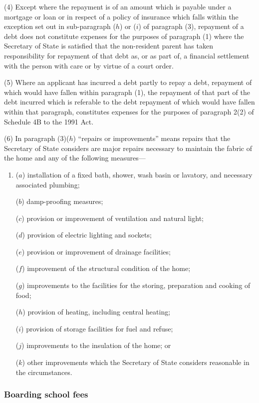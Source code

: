 \documentclass[12pt,a4paper]{article}
\begin{document}
(4) Except where the repayment is of an amount which is payable under a mortgage or loan or in respect of a policy of insurance which falls within the exception set out in sub-paragraph ($h$)  or ($i$)  of paragraph (3), repayment of a debt does not constitute expenses for the purposes of paragraph (1) where the Secretary of State is satisfied that the non-resident parent has taken responsibility for repayment of that debt as, or as part of, a financial settlement with the person with care or by virtue of a court order.

(5) Where an applicant has incurred a debt partly to repay a debt, repayment of which would have fallen within paragraph (1), the repayment of that part of the debt incurred which is referable to the debt repayment of which would have fallen within that paragraph, constitutes expenses for the purposes of paragraph 2(2) of Schedule 4B to the 1991 Act.

(6) In paragraph (3)($h$)  “repairs or improvements” means repairs that the Secretary of State considers are major repairs necessary to maintain the fabric of the home and any of the following measures—
\begin{enumerate}\item[]
($a$) installation of a fixed bath, shower, wash basin or lavatory, and necessary associated plumbing;

($b$) damp-proofing measures;

($c$) provision or improvement of ventilation and natural light;

($d$) provision of electric lighting and sockets;

($e$) provision or improvement of drainage facilities;

($f$) improvement of the structural condition of the home;

($g$) improvements to the facilities for the storing, preparation and cooking of food;

($h$) provision of heating, including central heating;

($i$) provision of storage facilities for fuel and refuse;

($j$) improvements to the insulation of the home; or

($k$) other improvements which the Secretary of State considers reasonable in the circumstances.
\end{enumerate}

\subsubsection[66. Boarding school fees]{Boarding school fees}
\end{document}
